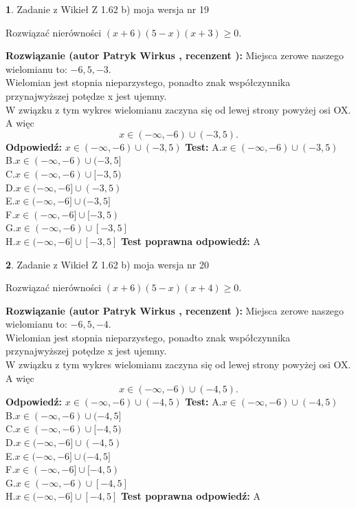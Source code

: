 \documentclass[12pt, a4paper]{article}
\theoremstyle{definition} %
\newtheorem{zad}{}
\newcommand{\zadStart}[1]{\begin{zad}#1\newline}
\newcommand{\zadStop}{\end{zad}}
\newcommand{\rozwStart}[2]{\noindent \textbf{Rozwiązanie (autor #1 , recenzent #2): }\newline}
\newcommand{\rozwStop}{\newline}
\newcommand{\odpStart}{\noindent \textbf{Odpowiedź:}\newline}
\newcommand{\odpStop}{\newline}
\newcommand{\testStart}{\noindent \textbf{Test:}\newline}
\newcommand{\testStop}{\newline}
\newcommand{\kluczStart}{\noindent \textbf{Test poprawna odpowiedź:}\newline}
\newcommand{\kluczStop}{\newline}
\begin{document}
\zadStart{Zadanie z Wikieł Z 1.62 b) moja wersja nr 19}

Rozwiązać nierówności $(x+6)(5-x)(x+3)\ge0$.
\zadStop
\rozwStart{Patryk Wirkus}{}
Miejsca zerowe naszego wielomianu to: $-6, 5, -3$.\\
Wielomian jest stopnia nieparzystego, ponadto znak współczynnika przy\linebreak najwyższej potędze x jest ujemny.\\ W związku z tym wykres wielomianu zaczyna się od lewej strony powyżej osi OX. A więc $$x \in (-\infty,-6) \cup (-3,5).$$
\rozwStop
\odpStart
$x \in (-\infty,-6) \cup (-3,5)$
\odpStop
\testStart
A.$x \in (-\infty,-6) \cup (-3,5)$\\
B.$x \in (-\infty,-6) \cup (-3,5]$\\
C.$x \in (-\infty,-6) \cup [-3,5)$\\
D.$x \in (-\infty,-6] \cup (-3,5)$\\
E.$x \in (-\infty,-6] \cup (-3,5]$\\
F.$x \in (-\infty,-6] \cup [-3,5)$\\
G.$x \in (-\infty,-6) \cup [-3,5]$\\
H.$x \in (-\infty,-6] \cup [-3,5]$
\testStop
\kluczStart
A
\kluczStop



\zadStart{Zadanie z Wikieł Z 1.62 b) moja wersja nr 20}

Rozwiązać nierówności $(x+6)(5-x)(x+4)\ge0$.
\zadStop
\rozwStart{Patryk Wirkus}{}
Miejsca zerowe naszego wielomianu to: $-6, 5, -4$.\\
Wielomian jest stopnia nieparzystego, ponadto znak współczynnika przy\linebreak najwyższej potędze x jest ujemny.\\ W związku z tym wykres wielomianu zaczyna się od lewej strony powyżej osi OX. A więc $$x \in (-\infty,-6) \cup (-4,5).$$
\rozwStop
\odpStart
$x \in (-\infty,-6) \cup (-4,5)$
\odpStop
\testStart
A.$x \in (-\infty,-6) \cup (-4,5)$\\
B.$x \in (-\infty,-6) \cup (-4,5]$\\
C.$x \in (-\infty,-6) \cup [-4,5)$\\
D.$x \in (-\infty,-6] \cup (-4,5)$\\
E.$x \in (-\infty,-6] \cup (-4,5]$\\
F.$x \in (-\infty,-6] \cup [-4,5)$\\
G.$x \in (-\infty,-6) \cup [-4,5]$\\
H.$x \in (-\infty,-6] \cup [-4,5]$
\testStop
\kluczStart
A
\kluczStop
\end{document}
